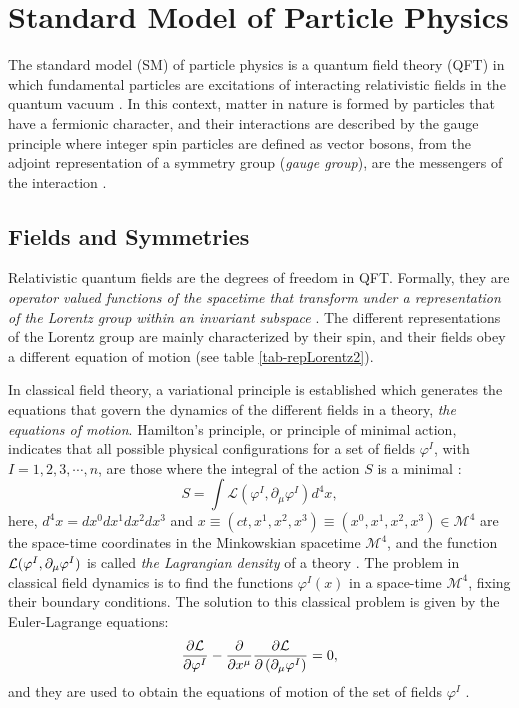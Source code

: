 \chapter{Standard Model of Particle Physics}

The standard model (SM) of particle physics is a quantum field theory (QFT) in which fundamental particles are excitations of interacting relativistic fields in the quantum vacuum \cite{greiner2000relativistic}. In this context, matter in nature is formed by particles that have a fermionic character, and their interactions are described by the gauge principle where integer spin particles are defined as vector bosons, from the adjoint representation of a symmetry group (\textit{gauge group}), are the messengers of the interaction \cite{pokorski2000gauge}.


\section{Fields and Symmetries}
Relativistic quantum fields are the degrees of freedom in QFT. Formally, they are \textit{operator valued functions of the spacetime that transform under a representation of the Lorentz group within an invariant subspace} \cite{Tong1995,CRodriguezUPTC}. The different representations of the Lorentz group are mainly characterized by their spin, and their fields obey a different equation of motion (see table \ref{tab-repLorentz2}). 

In classical field theory, a variational principle is established which generates the equations that govern the dynamics of the different fields in a theory, \textit{the equations of motion}. Hamilton's principle, or principle of minimal action, indicates that all possible physical configurations for a set of fields $\varphi^I$, with $I=1,2,3,\cdots,n$, are those where the integral of the action $S$ is a minimal \cite{Goldstein,jose1998classical}:
\begin{equation}\label{eq-action}
	S=\int \mathcal{L}(\varphi^I,\partial_\mu\varphi^I) d^4x,
\end{equation}
here, $d^4x=dx^0dx^1 dx^2dx^3$ and $x\equiv(ct,x^1,x^2,x^3)\equiv(x^0,x^1,x^2,x^3)\in\mathcal{M}^4$ are the space-time coordinates in the Minkowskian spacetime $\mathcal M^4$, and the function $\mathcal{L}(\varphi^I,\partial_\mu\varphi^I)$ is called \textit{the Lagrangian density} of a theory \cite{greiner2000relativistic,Goldstein}. The problem in classical field dynamics is to find the functions $\varphi^I(x)$ in a space-time $\mathcal{M}^4$, fixing their boundary conditions. The solution to this classical problem is given by the Euler-Lagrange equations:
\begin{equation}\label{eq_EulerLag}
	\dpr{\mathcal{L}}{\varphi^I}-\dpr{}{x^\mu}\dpr{\lag}{\fac{\partial_\mu \varphi^I}}=0,
\end{equation}
and they are used to obtain the equations of motion of the set of fields $\varphi^I$ \cite{jose1998classical}. 

